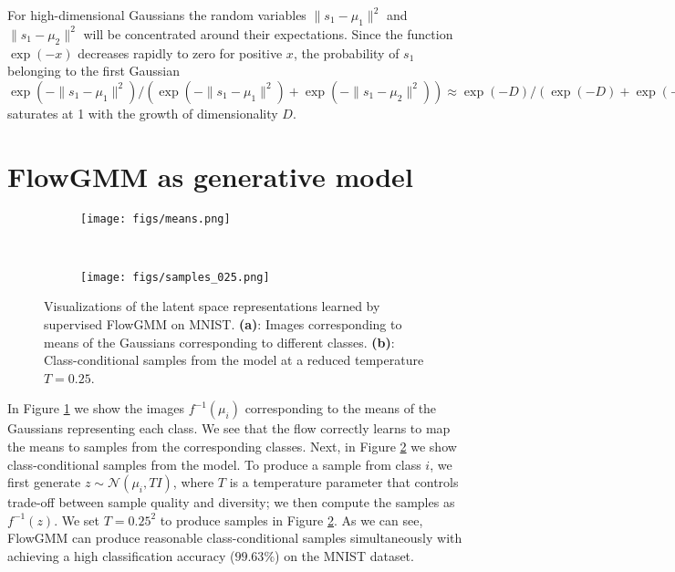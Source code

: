 \documentclass{article}
\newcommand{\method}{FlowGMM\xspace}
\newcommand{\mN}{\mathcal{N}}
\begin{document}
For high-dimensional Gaussians the random variables $\|s_1- \mu_1\|^2$ and $\|s_1 - \mu_2\|^2$ will be concentrated around their expectations.
Since the function $\exp(-x)$ decreases rapidly to zero for positive $x$, the probability of $s_1$ belonging to the first Gaussian $\exp(-\|s_1 - \mu_1\|^2) / \left( \exp(-\|s_1 - \mu_1\|^2) + \exp(-\|s_1 - \mu_2\|^2) \right) \approx \exp(-D) / (\exp(-D) + \exp(-3 D)) = 1 / (1 + \exp(-2D))$ saturates at 1 with the growth of dimensionality $D$.

\section{\method as generative model}
\label{sec:samples}

\begin{figure}[h!]
	\centering
	\begin{subfigure}{0.02\textwidth}
		\texttt{[image: figs/means.png]}
		\caption{}\label{fig:means}
	\end{subfigure}
	~~
	\begin{subfigure}{0.2\textwidth}
		\texttt{[image: figs/samples\_025.png]}
		\caption{
		}\label{fig:samples}
	\end{subfigure}
	\caption{
		Visualizations of the latent space representations learned by supervised \method
    	on MNIST. 
        \textbf{(a)}: Images corresponding to means of the Gaussians corresponding to 
        different classes. 
        \textbf{(b)}: Class-conditional samples from the model at a reduced temperature $T=0.25$.}
        \label{fig:mean_samples}
\end{figure}

In Figure \ref{fig:means} we show the images $f^{-1}(\mu_i)$ corresponding
to the means of the Gaussians representing each class.
We see that the flow correctly learns to map the means to samples from the corresponding classes.
Next, in Figure \ref{fig:samples} we show class-conditional samples from the model. To produce a sample from class $i$, we first generate $z \sim \mN(\mu_i, T I)$,
where $T$ is a temperature parameter 
that controls trade-off between sample quality
and diversity; we then compute the samples as $f^{-1}(z)$. 
We set $T = 0.25^2$ to produce samples in Figure \ref{fig:samples}. 
As we can see, \method can produce reasonable class-conditional samples simultaneously
with achieving a high classification accuracy ($99.63\%$) on the MNIST dataset.
\end{document}
